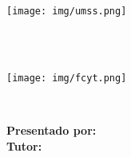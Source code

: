 \begin{titlepage}
    \begin{minipage}{2.3cm}
        \begin{center}
            \texttt{[image: img/umss.png]}
        \end{center}
    \end{minipage}
    \hfill
    \begin{minipage}{12cm}
        \begin{center}
            \large{ \textbf{\MakeUppercase{\nombreUniversidad}} }\\
            \normalsize{ \textbf{\MakeUppercase{\nombreFacultad}} }\\
            \footnotesize{ \textbf{\MakeUppercase{\nombreCarrera}} }
        \end{center}
    \end{minipage}
    \hfill
    \begin{minipage}{2cm}
        \begin{center}
            \texttt{[image: img/fcyt.png]}
        \end{center}
    \end{minipage}
    \vspace{3cm}\\
    \begin{center}
        \Large{ \textbf{\MakeUppercase{\nombreProyecto}} }
    \end{center}
    \vspace{4cm}
    \begin{center}
        \begin{minipage}{13cm}
            \begin{center}
                \descripcion
            \end{center}
        \end{minipage}
    \end{center}
    \vspace{3cm}
    \textnormal{\textbf{Presentado por:} \nombreAutor}\\

    \textnormal{\textbf{Tutor:} \nombreTutor}\\

    \vspace{2cm}
    \begin{center}
        \textbf{\MakeUppercase{\nombreCiudadPais}}\\
        \fecha
    \end{center}
\end{titlepage}
\restoregeometry
